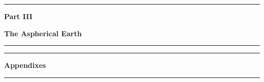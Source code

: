 \documentclass[fleqn,openany]{book}
\begin{document}
\begin{CJK*}{UTF8}{gkai}
%
%
%
%
%

\newpage{\pagestyle{empty}\cleardoublepage}
\thispagestyle{empty}
\vspace*{22mm}
\begin{center}
\rule{\linewidth}{0.5mm}
\end{center}
\begin{center}
\huge{\textbf{Part III}}
\end{center}
\begin{center}
\Huge{\textbf{The Aspherical Earth}}
\rule{\linewidth}{0.5mm}
\end{center}
\newpage{\pagestyle{empty}\cleardoublepage}


%
%
%

\newpage{\pagestyle{empty}\cleardoublepage}
\thispagestyle{empty}
\vspace*{27mm}
\begin{center}
\rule{\linewidth}{0.5mm}
\end{center}
\begin{center}
\Huge{\textbf{Appendixes}}
\rule{\linewidth}{0.5mm}
\end{center}
\newpage{\pagestyle{empty}\cleardoublepage}

\appendix
\renewcommand{\thesection}{\Alph{chapter}.\arabic{section}}
\renewcommand{\thesubsection}{\Alph{chapter}.\arabic{section}.\arabic{subsection}}
%
%
%
%
\renewcommand{\thesection}{\arabic{chapter}.\arabic{section}}
\renewcommand{\thesubsection}{\arabic{chapter}.\arabic{section}.\arabic{subsection}}

\newpage{\pagestyle{empty}\cleardoublepage}
\small
%
\normalsize

\newpage{\pagestyle{empty}\cleardoublepage}
\small
\printindex
\normalsize

\end{CJK*}
\end{document}
